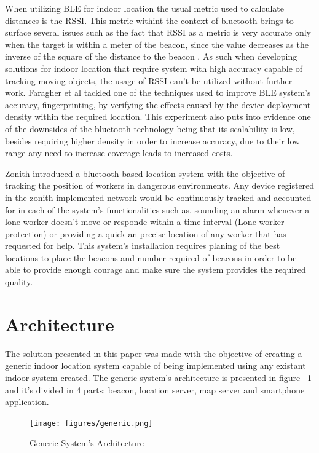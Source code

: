 \documentclass[a4paper]{IEEEtran}
\begin{document}
When utilizing BLE for indoor location the usual metric used to calculate distances is the RSSI. This metric withint the context of bluetooth brings to surface several issues such as the fact that RSSI as a metric is very accurate only when the target is within a meter of the beacon, since the value decreases as the inverse of the square of the distance to the beacon . As such when developing solutions for indoor location that require system with high accuracy capable of tracking moving objects, the usage of RSSI can't be utilized without further work. Faragher et al \cite{bleacc} tackled one of the techniques used to improve BLE system's accuracy, fingerprinting, by verifying the effects caused by the device deployment density within the required location. This experiment also puts into evidence one of the downsides of the bluetooth technology being that its scalability is low, besides requiring higher density in order to increase accuracy, due to their low range any need to increase coverage leads to increased costs.


Zonith \cite{zonith} introduced a bluetooth based location system with the objective of tracking the position of workers in dangerous environments. Any device registered in the zonith implemented network would be continuously tracked and accounted for in each of the system's functionalities such as, sounding an alarm whenever a lone worker doesn't move or responde within a time interval (Lone worker protection) or providing a quick an precise location of any worker that has requested for help. This system's installation requires planing of the best locations to place the beacons and number required of beacons in order to be able to provide enough courage and make sure the system provides the required quality.


\section{Architecture}
\label{sec:architecture}

The solution presented in this paper was made with the objective of creating a generic indoor location system capable of being implemented using any existant indoor system created. The generic system's architecture is presented in figure ~\ref{fig:generic} and it's divided in 4 parts: beacon, location server, map server and smartphone application. 

\begin{figure}
	\centering
		\texttt{[image: figures/generic.png]}
	\caption[Generic System's Architecture]{Generic System's Architecture}
	\label{fig:generic}
\end{figure}
\end{document}

